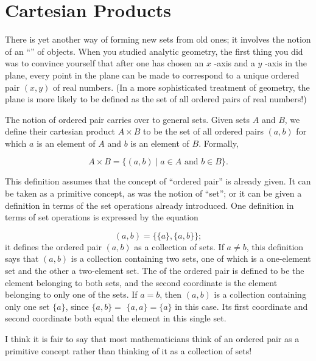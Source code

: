 \section*{Cartesian Products}

There is yet another way of forming new sets from old ones; it involves the notion of an 
``'' of objects. When you studied analytic geometry, the first thing you did 
was to convince yourself that after one has chosen an \(x\) -axis and a \(y\) -axis in the 
plane, every point in the plane can be made to correspond to a unique ordered pair \((x, y)\) of 
real numbers. (In a more sophisticated treatment of geometry, the plane is more likely to be 
defined as the set of all ordered pairs of real numbers!)

The notion of ordered pair carries over to general sets. Given sets \(A\) and \(B\), 
we define their cartesian product \(A \times B\) to be the set of all ordered pairs \((a, b)\) for which \(a\) is an element of \(A\) and \(b\) is an element of \(B\). Formally,

\[
A \times B = \{ ({a,b}) \mid a \in A\text{ and }b \in B\}.
\]

\begin{centeredblock*}
 This definition assumes that the concept of ``ordered pair'' is already given. 
 It can be taken as a primitive concept, as was the notion of ``set''; or it can be 
 given a definition in terms of the set operations already introduced. One definition 
 in terms of set operations is expressed by the equation

 \[
 ({a,b}) = \{ \{ a\},\{ a,b\} \} ;
 \]
 it defines the ordered pair \((a, b)\) as a collection of sets. If \(a \neq b\), 
 this definition says that \((a, b)\) is a collection containing two sets, 
 one of which is a one-element set and the other a two-element set. 
 The  of the ordered pair is defined to be the element belonging to both sets, 
 and the second coordinate is the element belonging to only one of the sets. If \(a = b\), 
 then \((a, b)\) is a collection containing only one set \(\{ a\}\), 
 since \(\{ a,b\} =\) \(\{ a,a\} = \{ a\}\) in this case. 
 Its first coordinate and second coordinate both equal the element in this single set.

 I think it is fair to say that most mathematicians think of an ordered pair as 
 a primitive concept rather than thinking of it as a collection of sets!
\end{centeredblock*}


